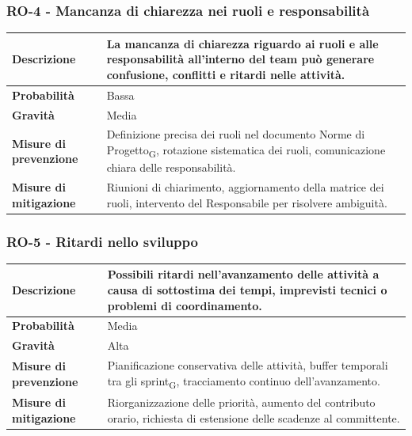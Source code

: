 \documentclass[11pt,a4paper]{article}
\newcommand{\gls}[1]{#1\textsubscript{G}}
\begin{document}
\subsubsection{RO-4 - Mancanza di chiarezza nei ruoli e responsabilità}
\begin{center}
\begin{tabular}{|p{3cm}|p{12cm}|}
    \hline
    \textbf{Descrizione} & La mancanza di chiarezza riguardo ai ruoli e alle responsabilità all'interno del team può generare confusione, conflitti e ritardi nelle attività. \\
    \hline
    \textbf{Probabilità} & Bassa \\
    \hline
    \textbf{Gravità} & Media \\
    \hline
    \textbf{Misure di prevenzione} & Definizione precisa dei ruoli nel documento \gls{Norme di Progetto}, rotazione sistematica dei ruoli, comunicazione chiara delle responsabilità. \\
    \hline
    \textbf{Misure di mitigazione} & Riunioni di chiarimento, aggiornamento della matrice dei ruoli, intervento del Responsabile per risolvere ambiguità. \\
    \hline
\end{tabular}
\end{center}

\subsubsection{RO-5 - Ritardi nello sviluppo}
\begin{center}
\begin{tabular}{|p{3cm}|p{12cm}|}
    \hline
    \textbf{Descrizione} & Possibili ritardi nell'avanzamento delle attività a causa di sottostima dei tempi, imprevisti tecnici o problemi di coordinamento. \\
    \hline
    \textbf{Probabilità} & Media \\
    \hline
    \textbf{Gravità} & Alta \\
    \hline
    \textbf{Misure di prevenzione} & Pianificazione conservativa delle attività, buffer temporali tra gli \gls{sprint}, tracciamento continuo dell'avanzamento. \\
    \hline
    \textbf{Misure di mitigazione} & Riorganizzazione delle priorità, aumento del contributo orario, richiesta di estensione delle scadenze al committente. \\
    \hline
\end{tabular}
\end{center}
\end{document}
